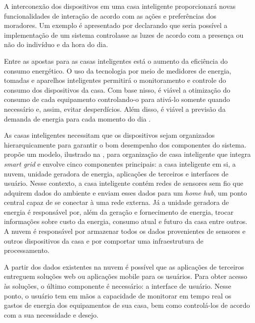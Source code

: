 A interconexão dos dispositivos em uma casa inteligente proporcionará novas funcionalidades de interação de acordo com as ações e preferências dos moradores. Um exemplo é apresentado por  declarando que seria possível a implementação de um sistema controlasse as luzes de acordo com a presença ou não do indivíduo e da hora do dia.

Entre as apostas para as casas inteligentes está o aumento da eficiência do consumo energético. O uso da tecnologia por meio de medidores de energia, tomadas e aparelhos inteligentes permitirá o monitoramento e controle do consumo dos dispositivos da casa. Com base nisso, é viável a otimização do consumo de cada equipamento controlando-o para ativá-lo somente quando necessário e, assim, evitar desperdícios. Além disso, é viável a previsão da demanda de energia para cada momento do dia \cite{Stojkoska2017}.

As casas inteligentes necessitam que os dispositivos sejam organizados hierarquicamente para garantir o bom desempenho dos componentes do sistema.  propõe um modelo, ilustrado na , para organização de casa inteligente que integra \textit{smart grid} e envolve cinco componentes principais: a casa inteligente em si, a nuvem, unidade geradora de energia, aplicações de terceiros e interfaces de usuário. Nesse contexto, a casa inteligente contém redes de sensores sem fio que adquirem dados do ambiente e enviam esses dados para um \textit{home hub}, um ponto central capaz de se conectar à uma rede externa. Já a unidade geradora de energia é responsável por, além da geração e fornecimento de energia, trocar informações sobre custo da energia, consumo atual e futuro da casa entre outros. 
A nuvem é responsável por armazenar todos os dados provenientes de sensores e outros dispositivos da casa e por comportar uma infraestrutura de processamento. 

A partir dos dados existentes na nuvem é possível que as aplicações de terceiros entreguem soluções web ou aplicações mobile para os usuários. Para obter acesso às soluções, o último componente é necessário: a interface de usuário. Nesse ponto, o usuário tem em mãos a capacidade de monitorar em tempo real os gastos de energia dos equipamentos de sua casa, bem como controlá-los de acordo com a sua necessidade e desejo.


